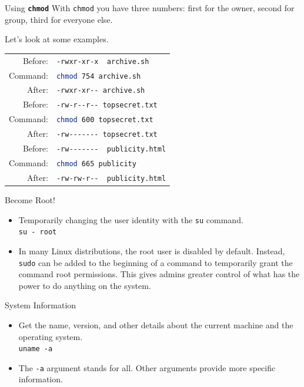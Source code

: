 \documentclass[14pt,aspectratio=1610]{beamer}
\begin{document}
\begin{frame}{Using \texttt{\textbf{chmod}}}
With \lstinline{chmod} you have three numbers: first for the owner, second for group, third for everyone else.

Let's look at some examples.\\
\begin{tabular}{| r  l |}
\hline
Before: & \lstinline{-rwxr-xr-x  archive.sh}\\
Command: & \lstinline[language=bash]{chmod 754 archive.sh} \\
After: & \lstinline{-rwxr-xr-- archive.sh} \\
\hline
\hline
Before: & \lstinline{-rw-r--r-- topsecret.txt} \\
Command: & \lstinline[language=bash]{chmod 600 topsecret.txt} \\
After: & \lstinline{-rw------- topsecret.txt} \\
\hline
\hline
Before: & \lstinline{-rw-------  publicity.html}  \\
Command: & \lstinline[language=bash]{chmod 665 publicity} \\
After: & \lstinline{-rw-rw-r--  publicity.html} \\
\hline
\end{tabular}
\end{frame}

\begin{frame}{Become Root!}
\begin{itemize}
\item
  Temporarily changing the user identity with the \lstinline{su} command.\\
  \lstinline{su - root}
\item
  In many Linux distributions, the root user is disabled by default. Instead, \lstinline{sudo} can be added to the beginning of a command to temporarily grant the command root permissions. This gives admins greater control of what has the power to do anything on the system.
\end{itemize}
\end{frame}


\begin{frame}{System Information}
\begin{itemize}
\item
  Get the name, version, and other details about the current machine and the operating system.\\
  \lstinline{uname -a}
\item
  The \lstinline{-a} argument stands for all. Other arguments provide more specific information.
\end{itemize}
\end{frame}
\end{document}
